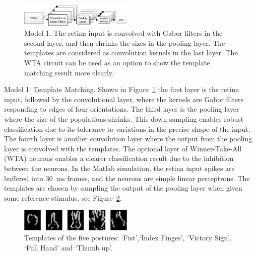 \documentclass[journal]{journal}
\begin{document}
\begin{figure}
\centering
	\includegraphics[width=0.48\textwidth]{pics/model1.pdf}
	\caption{Model 1. 
	The retina input is convolved with Gabor filters in the second layer, and then shrinks the sizes in the pooling layer.
	The templates are considered as convolution kernels in the last layer.
	The WTA circuit can be used as an option to show the template matching result more clearly.
	}
	\label{fig:model1}
\end{figure}

Model 1: Template Matching. Shown in Figure~\ref{fig:model1} the first layer is the retina input, followed by the convolutional layer, where the kernels are Gabor filters responding to edges of four orientations.
The third layer is the pooling layer where the size of the populations shrinks. 
This down-sampling enables robust classification due to its tolerance to variations in the precise shape of the input. 
The fourth layer is another convolution layer where the output from the pooling layer is convolved with the templates.
The optional layer of Winner-Take-All (WTA) neurons enables a clearer classification result due to the inhibition between the neurons.
In the Matlab simulation, the retina input spikes are buffered into 30~ms frames, and the neurons are simple linear perceptrons.
The templates are chosen by sampling the output of the pooling layer when given some reference stimulus, see Figure~\ref{fig:template}.

\begin{figure}
\centering
	\includegraphics[width=0.48\textwidth]{pics/gesture.pdf}
	\caption{Templates of the five postures: `Fist',`Index Finger', `Victory Sign', `Full Hand' and `Thumb up'.}
	\label{fig:template}
\end{figure}
\end{document}
